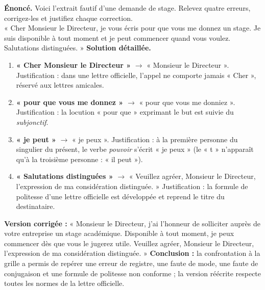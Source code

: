 \documentclass[11pt]{article}
\begin{document}
\begin{exoresolu}
\textbf{Énoncé.} Voici l'extrait fautif d'une demande de stage. Relevez quatre erreurs, corrigez-les et justifiez chaque correction.\\
« Cher Monsieur le Directeur, je vous écris pour que vous me donnez un stage. Je suis disponible à tout moment et je peut commencer quand vous voulez. Salutations distinguées. »
\tcblower
\textbf{Solution détaillée.}
\begin{enumerate}
\item \textbf{« Cher Monsieur le Directeur »} $\rightarrow$ « Monsieur le Directeur ». Justification : dans une lettre officielle, l'appel ne comporte jamais « Cher », réservé aux lettres amicales.
\item \textbf{« pour que vous me donnez »} $\rightarrow$ « pour que vous me donniez ». Justification : la locution « pour que » exprimant le but est suivie du \emph{subjonctif}.
\item \textbf{« je peut »} $\rightarrow$ « je peux ». Justification : à la première personne du singulier du présent, le verbe \emph{pouvoir} s'écrit « je peux » (le « t » n'apparaît qu'à la troisième personne : « il peut »).
\item \textbf{« Salutations distinguées »} $\rightarrow$ « Veuillez agréer, Monsieur le Directeur, l'expression de ma considération distinguée. » Justification : la formule de politesse d'une lettre officielle est développée et reprend le titre du destinataire.
\end{enumerate}
\textbf{Version corrigée :} « Monsieur le Directeur, j'ai l'honneur de solliciter auprès de votre entreprise un stage académique. Disponible à tout moment, je peux commencer dès que vous le jugerez utile. Veuillez agréer, Monsieur le Directeur, l'expression de ma considération distinguée. »
\textbf{Conclusion :} la confrontation à la grille a permis de repérer une erreur de registre, une faute de mode, une faute de conjugaison et une formule de politesse non conforme ; la version réécrite respecte toutes les normes de la lettre officielle.
\end{exoresolu}
\end{document}
